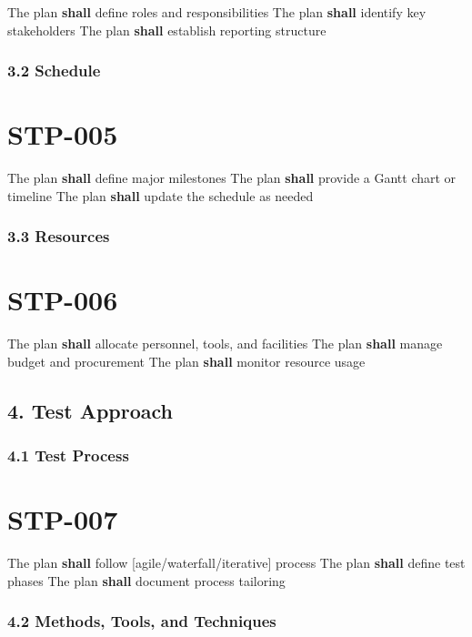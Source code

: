 The plan \textbf{shall} define roles and responsibilities
The plan \textbf{shall} identify key stakeholders
The plan \textbf{shall} establish reporting structure

\subsubsection{3.2 Schedule}

\section{STP-005}\label{STP-005}

The plan \textbf{shall} define major milestones
The plan \textbf{shall} provide a Gantt chart or timeline
The plan \textbf{shall} update the schedule as needed

\subsubsection{3.3 Resources}

\section{STP-006}\label{STP-006}

The plan \textbf{shall} allocate personnel, tools, and facilities
The plan \textbf{shall} manage budget and procurement
The plan \textbf{shall} monitor resource usage

\subsection{4. Test Approach}

\subsubsection{4.1 Test Process}

\section{STP-007}\label{STP-007}

The plan \textbf{shall} follow [agile/waterfall/iterative] process
The plan \textbf{shall} define test phases
The plan \textbf{shall} document process tailoring

\subsubsection{4.2 Methods, Tools, and Techniques}

